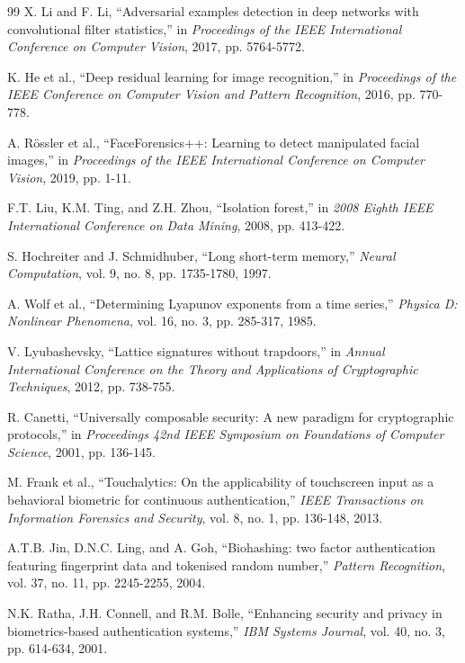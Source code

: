 \documentclass[12pt,a4paper]{article}
\begin{document}
\begin{thebibliography}{99}
X. Li and F. Li, ``Adversarial examples detection in deep networks with convolutional filter statistics,'' in \emph{Proceedings of the IEEE International Conference on Computer Vision}, 2017, pp. 5764-5772.

K. He et al., ``Deep residual learning for image recognition,'' in \emph{Proceedings of the IEEE Conference on Computer Vision and Pattern Recognition}, 2016, pp. 770-778.

A. Rössler et al., ``FaceForensics++: Learning to detect manipulated facial images,'' in \emph{Proceedings of the IEEE International Conference on Computer Vision}, 2019, pp. 1-11.

F.T. Liu, K.M. Ting, and Z.H. Zhou, ``Isolation forest,'' in \emph{2008 Eighth IEEE International Conference on Data Mining}, 2008, pp. 413-422.

S. Hochreiter and J. Schmidhuber, ``Long short-term memory,'' \emph{Neural Computation}, vol. 9, no. 8, pp. 1735-1780, 1997.

A. Wolf et al., ``Determining Lyapunov exponents from a time series,'' \emph{Physica D: Nonlinear Phenomena}, vol. 16, no. 3, pp. 285-317, 1985.

V. Lyubashevsky, ``Lattice signatures without trapdoors,'' in \emph{Annual International Conference on the Theory and Applications of Cryptographic Techniques}, 2012, pp. 738-755.

R. Canetti, ``Universally composable security: A new paradigm for cryptographic protocols,'' in \emph{Proceedings 42nd IEEE Symposium on Foundations of Computer Science}, 2001, pp. 136-145.

M. Frank et al., ``Touchalytics: On the applicability of touchscreen input as a behavioral biometric for continuous authentication,'' \emph{IEEE Transactions on Information Forensics and Security}, vol. 8, no. 1, pp. 136-148, 2013.

A.T.B. Jin, D.N.C. Ling, and A. Goh, ``Biohashing: two factor authentication featuring fingerprint data and tokenised random number,'' \emph{Pattern Recognition}, vol. 37, no. 11, pp. 2245-2255, 2004.

N.K. Ratha, J.H. Connell, and R.M. Bolle, ``Enhancing security and privacy in biometrics-based authentication systems,'' \emph{IBM Systems Journal}, vol. 40, no. 3, pp. 614-634, 2001.

\end{thebibliography}
\end{document}
